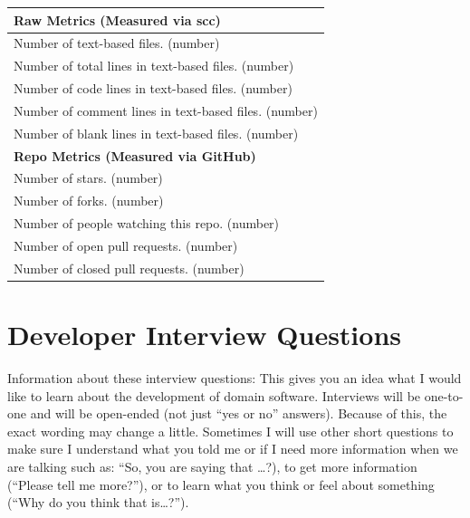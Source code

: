 \documentclass[12pt, notitlepage]{article}
\begin{document}
\begin{appendices}
\begin{singlespace}
\def\arraystretch{1.4}
\begin{tabular}{p{14cm}}
		\hline		
	\textbf{Raw Metrics (Measured via scc)}\\
	\hline
	Number of text-based files. (number)\\
	Number of total lines in text-based files. (number)\\
	Number of code lines in text-based files. (number)\\
	Number of comment lines in text-based files. (number)\\
	Number of blank lines in text-based files. (number)\\
	\hline
	\textbf{Repo Metrics (Measured via GitHub)}\\
	\hline
	Number of stars. (number)\\
	Number of forks. (number)\\
	Number of people watching this repo. (number)\\
	Number of open pull requests. (number)\\
	Number of closed pull requests. (number)\\
	\hline
\end{tabular}

\newpage	

\section{Developer Interview Questions}\label{interviewquestions}

Information about these interview questions:  This gives you an idea what I would like to learn about the development of {domain} software. Interviews will be one-to-one and will be open-ended (not just “yes or no” answers). Because of this, the exact wording may change a little. Sometimes I will use other short questions to make sure I understand what you told me or if I need more information when we are talking such as: “So, you are saying that …?), to get more information (“Please tell me more?”), or to learn what you think or feel about something (“Why do you think that is…?”). 


\end{singlespace}
\end{appendices}
\end{document}
